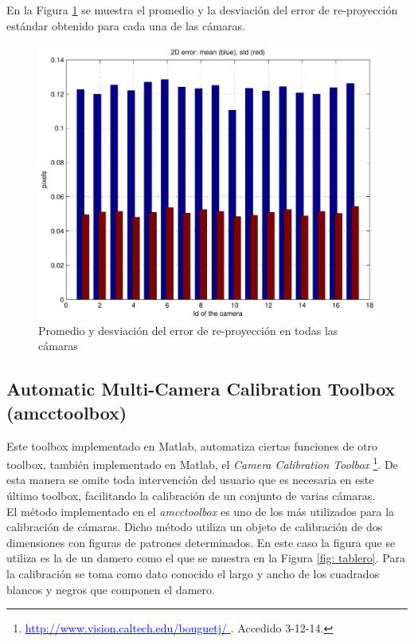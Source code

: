 En la Figura \ref{fig: error reproyeccion} se muestra el promedio y la desviación del error de re-proyección estándar obtenido para cada una de las cámaras.

\begin{figure}[ht!]
\begin{center}
\includegraphics[scale=0.4]{img/calibracion/reprerrors.pdf}
\end{center}

\caption{Promedio y desviación  del error de re-proyección en todas las cámaras }
\label{fig: error reproyeccion}
\end{figure}
  





\subsection{Automatic Multi-Camera Calibration Toolbox (amcctoolbox)}


Este toolbox  \cite{amcctoolbox} implementado en Matlab, automatiza ciertas funciones de otro toolbox, también implementado en Matlab, el \textit{Camera Calibration Toolbox} \footnote{\textcolor{blue}{\underline{http://www.vision.caltech.edu/bouguetj/   }}. Accedido 3-12-14.}. De esta manera se omite toda intervención del usuario que es necesaria en este último toolbox, facilitando la calibración de un conjunto de varias cámaras.\\

El método implementado en el \textit{amcctoolbox} es uno de los más utilizados para la calibración de cámaras. Dicho método utiliza un objeto de calibración de dos dimensiones con figuras de patrones determinados. En este caso la figura que se utiliza es la de un damero como el que se muestra en la Figura \ref{fig: tablero}. Para la calibración se toma como dato conocido el largo y ancho de los cuadrados blancos y negros que componen el damero.

